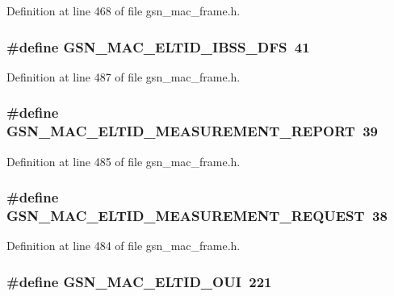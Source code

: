 Definition at line 468 of file gsn\_\-mac\_\-frame.h.

\hypertarget{a00523_a4d517bf86f17132796f81d534812dfc3}{
\subsubsection[{GSN\_\-MAC\_\-ELTID\_\-IBSS\_\-DFS}]{\setlength{\rightskip}{0pt plus 5cm}\#define GSN\_\-MAC\_\-ELTID\_\-IBSS\_\-DFS~41}}
\label{a00523_a4d517bf86f17132796f81d534812dfc3}


Definition at line 487 of file gsn\_\-mac\_\-frame.h.

\hypertarget{a00523_a8b1f0cce85abeddecd5a4789a7be5877}{
\subsubsection[{GSN\_\-MAC\_\-ELTID\_\-MEASUREMENT\_\-REPORT}]{\setlength{\rightskip}{0pt plus 5cm}\#define GSN\_\-MAC\_\-ELTID\_\-MEASUREMENT\_\-REPORT~39}}
\label{a00523_a8b1f0cce85abeddecd5a4789a7be5877}


Definition at line 485 of file gsn\_\-mac\_\-frame.h.

\hypertarget{a00523_a74206ded393143ed4a945c22124274c4}{
\subsubsection[{GSN\_\-MAC\_\-ELTID\_\-MEASUREMENT\_\-REQUEST}]{\setlength{\rightskip}{0pt plus 5cm}\#define GSN\_\-MAC\_\-ELTID\_\-MEASUREMENT\_\-REQUEST~38}}
\label{a00523_a74206ded393143ed4a945c22124274c4}


Definition at line 484 of file gsn\_\-mac\_\-frame.h.

\hypertarget{a00523_a300e90e8001ce21c4acb3e48e37a6578}{
\subsubsection[{GSN\_\-MAC\_\-ELTID\_\-OUI}]{\setlength{\rightskip}{0pt plus 5cm}\#define GSN\_\-MAC\_\-ELTID\_\-OUI~221}}
\label{a00523_a300e90e8001ce21c4acb3e48e37a6578}


